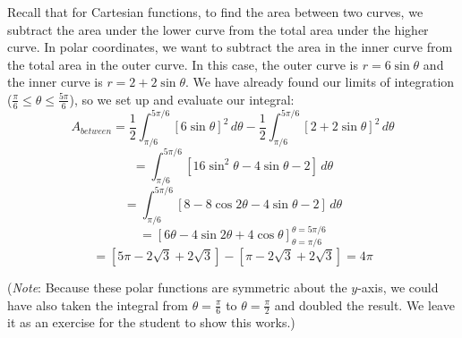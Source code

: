 Recall that for Cartesian functions, to find the area between two curves, we 
subtract the area under the lower curve from the total area under the higher 
curve. In polar coordinates, we want to subtract the area in the inner curve 
from the total area in the outer curve. In this case, the outer curve is $r = 
6\sin{\theta}$ and the inner curve is $r = 2 + 2\sin{\theta}$. We have already 
found our limits of integration ($\frac{\pi}{6} \leq \theta \leq \frac{5 \pi}{
6}$), so we set up and evaluate our integral:
$$A_{between} = \frac{1}{2} \int_{\pi / 6}^{5 \pi / 6} \left[ 6 \sin{\theta} \right]^2\,d\theta - \frac{1}{2} \int_{\pi / 6}^{5 \pi / 6} \left[ 2 + 2 \sin{\theta} \right]^2\,d\theta$$
$$= \int_{\pi / 6}^{5 \pi / 6} \left[ 16 \sin^2{\theta} - 4\sin{\theta} - 2 \right]\,d\theta$$
$$= \int_{\pi / 6}^{5 \pi / 6} \left[ 8 - 8\cos{2\theta} - 4\sin{\theta} - 2 \right]\,d\theta$$
$$= \left[ 6\theta - 4\sin{2\theta} + 4\cos{\theta} \right]_{\theta = \pi / 6}^{\theta = 5 \pi / 6}$$
$$= \left[ 5\pi - 2\sqrt{3} + 2\sqrt{3} \right] - \left[ \pi - 2\sqrt{3} + 2\sqrt{3} \right] = 4\pi$$

(\textit{Note}: Because these polar functions are symmetric about the $y$-axis,
we could have also taken the integral from $\theta = \frac{\pi}{6}$ to $\theta 
= \frac{\pi}{2}$ and doubled the result. We leave it as an exercise for the 
student to show this works.)

